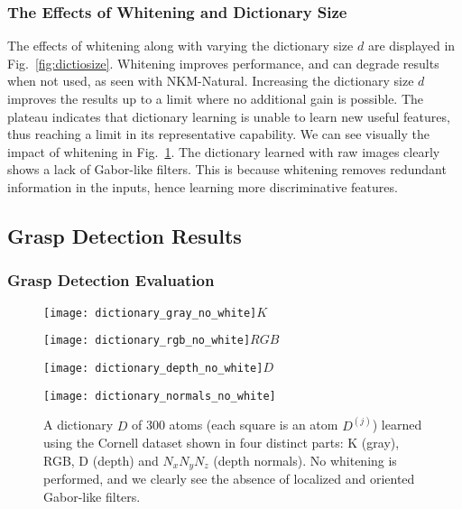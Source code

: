 \documentclass[svgnames]{scrartcl}
\begin{document}
\subsubsection{The Effects of Whitening and Dictionary Size}

The effects of whitening along with varying the dictionary size $d$ are displayed in Fig.~\ref{fig:dictiosize}. Whitening improves performance, and can degrade results when not used, as seen with NKM-Natural. Increasing the dictionary size $d$ improves the results up to a limit where no additional gain is possible. The plateau indicates that dictionary learning is unable to learn new useful features, thus reaching a limit in its representative capability. We can see visually the impact of whitening in Fig.~\ref{fig:dictionary_no_white}. The dictionary learned with raw images clearly shows a lack of Gabor-like filters. This is because whitening removes redundant information in the inputs, hence learning more discriminative features. 

\subsection{Grasp Detection Results}

\subsubsection{Grasp Detection Evaluation}

\begin{figure}[t]
    \centering
    \begin{minipage}{0.3\linewidth}
        \centering
        \texttt{[image: dictionary\_gray\_no\_white]}{\scriptsize $K$}
    \end{minipage}%
    \begin{minipage}{0.3\linewidth}
        \centering
        \texttt{[image: dictionary\_rgb\_no\_white]}{\scriptsize $RGB$}
    \end{minipage}%
    
    \begin{minipage}{0.3\linewidth}
        \centering
        \texttt{[image: dictionary\_depth\_no\_white]}{\scriptsize $D$}
    \end{minipage}%
    \begin{minipage}{0.3\linewidth}
        \centering
        \texttt{[image: dictionary\_normals\_no\_white]}
        \vspace{-3pt}{\scriptsize  $N_x N_y N_z$}
    \end{minipage}%
    \caption{A dictionary $D$ of 300 atoms (each square is an atom $D^{(j)}$) learned using the Cornell dataset shown in four distinct parts: K (gray), RGB, D (depth) and $N_x N_y N_z$ (depth normals). No whitening is performed, and we clearly see the absence of localized and oriented Gabor-like filters.}
    \label{fig:dictionary_no_white}
\end{figure}
\end{document}
